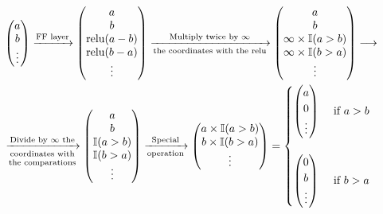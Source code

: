 \begin{align*}
    & \left( \begin{matrix} a \\ b \\ \vdots \\ \end{matrix} \right) 
    \xrightarrow{\text{FF layer}}
    \left( \begin{matrix} a \\ b \\ \text{relu}(a-b) \\ \text{relu}(b-a) \\ \vdots \\ \end{matrix} \right) 
    \xrightarrow[\text{the coordinates with the relu}]{\text{Multiply twice by $\infty$}}
    \left( \begin{matrix} a \\ b \\ \infty \times \mathbb{I}(a>b) \\ \infty \times \mathbb{I}(b>a) \\ \vdots \\ \end{matrix} \right) \longrightarrow 
    \\
    & \xrightarrow[\text{\text{\shortstack{coordinates with \\ the comparations}}}]{\text{Divide by $\infty$ the}}
    \left( \begin{matrix} a \\ b \\ \mathbb{I}(a>b) \\ \mathbb{I}(b>a) \\ \vdots \\ \end{matrix} \right)
    \xrightarrow[\text{operation}]{\text{Special}}
    \left( \begin{matrix} a \times \mathbb{I}(a>b) \\ b \times \mathbb{I}(b>a) \\ \vdots \\ \end{matrix} \right)
    = \begin{cases}
        \left( \begin{matrix} a \\ 0 \\ \vdots \\ \end{matrix} \right) & \text{ if } a > b \\
        \\
        \left( \begin{matrix} 0 \\ b \\ \vdots \\ \end{matrix} \right) & \text{ if } b > a 
    \end{cases}
\end{align*}


